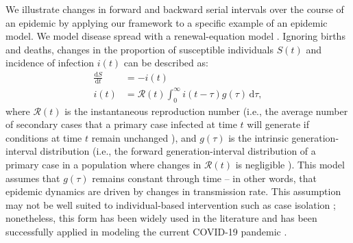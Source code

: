 \documentclass[12pt]{article}
\newcommand{\RR}{\ensuremath{{\mathcal R}}\xspace}
\newcommand{\dd}[1]{\ensuremath{\, \mathrm{d}#1}}
\newcommand{\dtau}{\dd{\tau}}
\newcommand{\gdist}{g} %
\begin{document}
We illustrate changes in forward and backward serial intervals over the course of an epidemic by applying our framework to a specific example of an epidemic model.
We model disease spread with a renewal-equation model \citep{heesterbeek1996concept, diekmann2000mathematical, roberts2004modelling, aldis2005integral, roberts2007model, champredon2018equivalence}.
Ignoring births and deaths, changes in the proportion of susceptible individuals $S(t)$ and incidence of infection $i(t)$ can be described as:
\begin{align}
\frac{\mathrm{d}S}{\mathrm{d}t} &= - i(t)\nonumber\\
i(t) &= \RR(t) \int_0^\infty i(t-\tau) \gdist(\tau) \dtau,
\label{eq:renewal}
\end{align}
where $\RR(t)$ is the instantaneous reproduction number (i.e., the average number of secondary cases that a primary case infected at time $t$ will generate if conditions at time $t$ remain unchanged \citep{fraser2007estimating}), and $\gdist(\tau)$ is the intrinsic generation-interval distribution (i.e., the forward generation-interval distribution of a primary case in a population where changes in $\RR(t)$ is negligible \citep{champredon2015intrinsic}).
This model assumes that $g(\tau)$ remains constant through time -- in other words, that epidemic dynamics are driven by changes in transmission rate. 
This assumption may not be well suited to individual-based intervention such as case isolation \citep{fraser2007estimating};
nonetheless, this form has been widely used in the literature and has been successfully applied in modeling the current COVID-19 pandemic \citep{gostic2020practical}.
\end{document}
